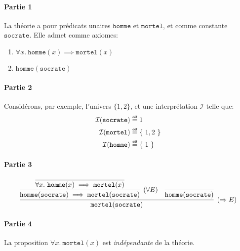 \documentclass[12pt,french,a4paper]{article}
\newcommand\eqdef{\mathrel{\overset{\makebox[0pt]{\mbox{\normalfont\tiny\sffamily déf}}}{=}}}
\begin{document}
\begin{question}
\paragraph{Partie 1}
La théorie a pour prédicats unaires $\texttt{homme}$ et $\texttt{mortel}$, et comme constante $\texttt{socrate}$.
Elle admet comme axiomes:
\begin{enumerate}
\item $\forall x.\ \texttt{homme}(x) \implies \texttt{mortel}(x)$
\item $\texttt{homme}(\texttt{socrate})$
\end{enumerate}

\paragraph{Partie 2}

Considérons, par exemple, l'univers $\{ 1, 2 \}$, et une interprétation $\mathcal{I}$ telle que:
\begin{align*}
\mathcal{I}(\texttt{socrate}) &\eqdef 1\\
\mathcal{I}(\texttt{mortel}) &\eqdef \{\ 1, 2\ \}\\
\mathcal{I}(\texttt{homme}) &\eqdef \{\ 1\ \}\\
\end{align*}

\paragraph{Partie 3}

\[
\infer[(\Rightarrow{}E)]{\texttt{mortel}(\texttt{socrate})}{
\infer[(\forall E)]{\texttt{homme}(\texttt{socrate}) \implies \texttt{mortel}(\texttt{socrate})}{
\infer[]{\forall x.\ \texttt{homme}(x) \implies \texttt{mortel}(x)}{}
} & \infer[]{\texttt{homme}(\texttt{socrate})}{}}
\]

\paragraph{Partie 4}

La proposition $\forall x.\ \texttt{mortel}(x)$ est \textit{indépendante} de la théorie.
\end{question}
\end{document}
